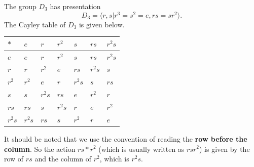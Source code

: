 \begin{example}\label{example-presentation-of-D3}
    The group $D_3$ has presentation
    \[
        D_3 = \langle r, s \vert r^3 = s^2 = e, rs = sr^2 \rangle.
    \]
    The Cayley table of $D_3$ is given below.

    \begin{table}[h]
        \centering
        \begin{tabular}{|l|l|l|l|l|l|l|}
        \hline
        $\ast$ & $e$    & $r$    & $r^2$  & $s$    & $rs$   & $r^2s$ \\ \hline
        $e$    & $e$    & $r$    & $r^2$  & $s$    & $rs$   & $r^2s$ \\ \hline
        $r$    & $r$    & $r^2$  & $e$    & $rs$   & $r^2s$ & $s$    \\ \hline
        $r^2$  & $r^2$  & $e$    & $r$    & $r^2s$ & $s$    & $rs$   \\ \hline
        $s$    & $s$    & $r^2s$ & $rs$   & $e$    & $r^2$  & $r$    \\ \hline
        $rs$   & $rs$   & $s$    & $r^2s$ & $r$    & $e$    & $r^2$  \\ \hline
        $r^2s$ & $r^2s$ & $rs$   & $s$    & $r^2$  & $r$    & $e$    \\ \hline
        \end{tabular}
    \end{table}

    It should be noted that we use the convention of reading the \textbf{row before the column}. So the action $rs \ast r^2$ (which is usually written as $rsr^2$) is given by the row of $rs$ and the column of $r^2$, which is $r^2s$.
\end{example}

